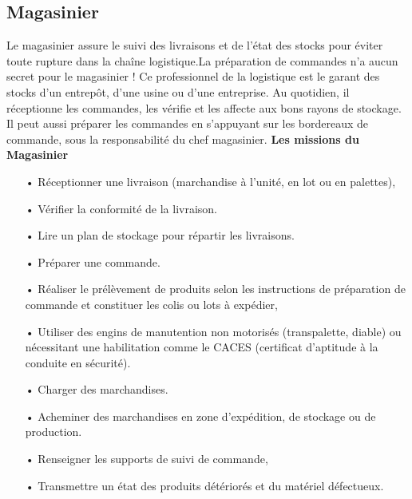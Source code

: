 \documentclass[edit,12pt,a4paper,ChapStyle,oneside,doubleinterligne]{report}
\begin{document}
\subsection{Magasinier}
Le magasinier assure le suivi des livraisons et de l’état des stocks pour éviter toute rupture dans la chaîne logistique.La préparation de commandes n’a aucun secret pour le magasinier ! Ce professionnel de la logistique est le garant des stocks d’un entrepôt, d’une usine ou d’une entreprise. Au quotidien, il réceptionne les commandes, les vérifie et les affecte aux bons rayons de stockage. Il peut aussi préparer les commandes en s’appuyant sur les bordereaux de commande, sous la responsabilité du chef magasinier\cite{Magasinier}.
\newline
\textbf{Les missions du Magasinier}\newline
\begin{itemize}
    \item [•]Réceptionner une livraison (marchandise à l’unité, en lot ou en palettes),
    \item [•] Vérifier la conformité de la livraison.
    \item [•] Lire un plan de stockage pour répartir les livraisons.
    \item [•] Préparer une commande.
    \item [•] Réaliser le prélèvement de produits selon les instructions de préparation de commande et constituer les colis ou lots à expédier,
    \item [•] Utiliser des engins de manutention non motorisés (transpalette, diable) ou nécessitant une habilitation comme le CACES (certificat d’aptitude à la conduite en sécurité).
    \item [•] Charger des marchandises.
    \item [•] Acheminer des marchandises en zone d'expédition, de stockage ou de production.
    \item [•] Renseigner les supports de suivi de commande,
    \item [•] Transmettre un état des produits détériorés et du matériel défectueux.
\end{itemize}
\end{document}
